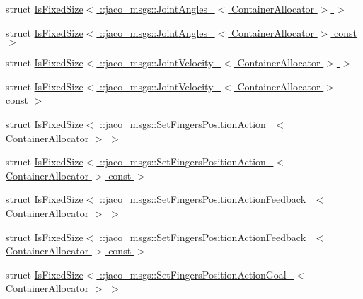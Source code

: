 \begin{DoxyCompactItemize}
\item 
struct \hyperlink{structros_1_1message__traits_1_1IsFixedSize_3_01_1_1jaco__msgs_1_1JointAngles___3_01ContainerAllocator_01_4_01_4}{Is\+Fixed\+Size$<$ \+::jaco\+\_\+msgs\+::\+Joint\+Angles\+\_\+$<$ Container\+Allocator $>$ $>$}
\item 
struct \hyperlink{structros_1_1message__traits_1_1IsFixedSize_3_01_1_1jaco__msgs_1_1JointAngles___3_01ContainerAllocator_01_4_01const_01_01_4}{Is\+Fixed\+Size$<$ \+::jaco\+\_\+msgs\+::\+Joint\+Angles\+\_\+$<$ Container\+Allocator $>$ const  $>$}
\item 
struct \hyperlink{structros_1_1message__traits_1_1IsFixedSize_3_01_1_1jaco__msgs_1_1JointVelocity___3_01ContainerAllocator_01_4_01_4}{Is\+Fixed\+Size$<$ \+::jaco\+\_\+msgs\+::\+Joint\+Velocity\+\_\+$<$ Container\+Allocator $>$ $>$}
\item 
struct \hyperlink{structros_1_1message__traits_1_1IsFixedSize_3_01_1_1jaco__msgs_1_1JointVelocity___3_01ContainerAllocator_01_4_01const_01_01_4}{Is\+Fixed\+Size$<$ \+::jaco\+\_\+msgs\+::\+Joint\+Velocity\+\_\+$<$ Container\+Allocator $>$ const  $>$}
\item 
struct \hyperlink{structros_1_1message__traits_1_1IsFixedSize_3_01_1_1jaco__msgs_1_1SetFingersPositionAction___3_01ContainerAllocator_01_4_01_4}{Is\+Fixed\+Size$<$ \+::jaco\+\_\+msgs\+::\+Set\+Fingers\+Position\+Action\+\_\+$<$ Container\+Allocator $>$ $>$}
\item 
struct \hyperlink{structros_1_1message__traits_1_1IsFixedSize_3_01_1_1jaco__msgs_1_1SetFingersPositionAction___3_01fe500e74a2a59eaf355e86c71d8f9b1}{Is\+Fixed\+Size$<$ \+::jaco\+\_\+msgs\+::\+Set\+Fingers\+Position\+Action\+\_\+$<$ Container\+Allocator $>$ const  $>$}
\item 
struct \hyperlink{structros_1_1message__traits_1_1IsFixedSize_3_01_1_1jaco__msgs_1_1SetFingersPositionActionFeedbab6306128ff49827b742b8b843075b28f}{Is\+Fixed\+Size$<$ \+::jaco\+\_\+msgs\+::\+Set\+Fingers\+Position\+Action\+Feedback\+\_\+$<$ Container\+Allocator $>$ $>$}
\item 
struct \hyperlink{structros_1_1message__traits_1_1IsFixedSize_3_01_1_1jaco__msgs_1_1SetFingersPositionActionFeedbaecc9c98bae88ed6b5ce86639e07564b9}{Is\+Fixed\+Size$<$ \+::jaco\+\_\+msgs\+::\+Set\+Fingers\+Position\+Action\+Feedback\+\_\+$<$ Container\+Allocator $>$ const  $>$}
\item 
struct \hyperlink{structros_1_1message__traits_1_1IsFixedSize_3_01_1_1jaco__msgs_1_1SetFingersPositionActionGoal__85342a82537d288e6c9f33743bb7590b}{Is\+Fixed\+Size$<$ \+::jaco\+\_\+msgs\+::\+Set\+Fingers\+Position\+Action\+Goal\+\_\+$<$ Container\+Allocator $>$ $>$}

\end{DoxyCompactItemize}
